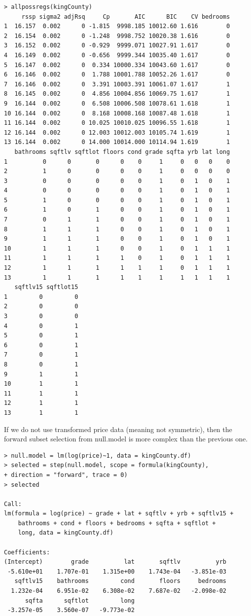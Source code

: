 \documentclass{article}%
\begin{document}
\begin{verbatim}
> allpossregs(kingCounty)
     rssp sigma2 adjRsq     Cp       AIC      BIC    CV bedrooms
1  16.157  0.002      0 -1.815  9998.185 10012.60 1.616        0
2  16.154  0.002      0 -1.248  9998.752 10020.38 1.616        0
3  16.152  0.002      0 -0.929  9999.071 10027.91 1.617        0
4  16.149  0.002      0 -0.656  9999.344 10035.40 1.617        0
5  16.147  0.002      0  0.334 10000.334 10043.60 1.617        0
6  16.146  0.002      0  1.788 10001.788 10052.26 1.617        0
7  16.146  0.002      0  3.391 10003.391 10061.07 1.617        1
8  16.145  0.002      0  4.856 10004.856 10069.75 1.617        1
9  16.144  0.002      0  6.508 10006.508 10078.61 1.618        1
10 16.144  0.002      0  8.168 10008.168 10087.48 1.618        1
11 16.144  0.002      0 10.025 10010.025 10096.55 1.618        1
12 16.144  0.002      0 12.003 10012.003 10105.74 1.619        1
13 16.144  0.002      0 14.000 10014.000 10114.94 1.619        1
   bathrooms sqftlv sqftlot floors cond grade sqfta yrb lat long
1          0      0       0      0    0     1     0   0   0    0
2          1      0       0      0    0     1     0   0   0    0
3          0      0       0      0    0     1     0   1   0    1
4          0      0       0      0    0     1     0   1   0    1
5          1      0       0      0    0     1     0   1   0    1
6          1      0       1      0    0     1     0   1   0    1
7          0      1       1      0    0     1     0   1   0    1
8          1      1       1      0    0     1     0   1   0    1
9          1      1       1      0    0     1     0   1   0    1
10         1      1       1      0    0     1     0   1   1    1
11         1      1       1      1    0     1     0   1   1    1
12         1      1       1      1    1     1     0   1   1    1
13         1      1       1      1    1     1     1   1   1    1
   sqftlv15 sqftlot15
1         0         0
2         0         0
3         0         0
4         0         1
5         0         1
6         0         1
7         0         1
8         0         1
9         1         1
10        1         1
11        1         1
12        1         1
13        1         1

 \end{verbatim}

If we do not use transformed price data (meaning not symmetric), then the forward subset selection from null.model is more complex than the previous one.
\begin{verbatim}
> null.model = lm(log(price)~1, data = kingCounty.df)
> selected = step(null.model, scope = formula(kingCounty),
+ direction = "forward", trace = 0)
> selected

Call:
lm(formula = log(price) ~ grade + lat + sqftlv + yrb + sqftlv15 + 
    bathrooms + cond + floors + bedrooms + sqfta + sqftlot + 
    long, data = kingCounty.df)

Coefficients:
(Intercept)        grade          lat       sqftlv          yrb  
 -5.610e+01    1.707e-01    1.315e+00    1.743e-04   -3.851e-03  
   sqftlv15    bathrooms         cond       floors     bedrooms  
  1.232e-04    6.951e-02    6.308e-02    7.687e-02   -2.098e-02  
      sqfta      sqftlot         long  
 -3.257e-05    3.560e-07   -9.773e-02  
\end{verbatim}
\end{document}
